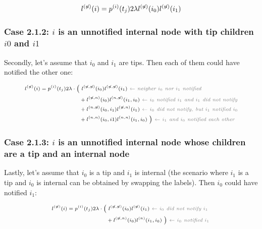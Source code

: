 \documentclass[10pt,letterpaper]{article}
\begin{document}
\begin{equation}
\scriptsize
l^{(\not{n})}(i) = p^{(i)}(t_j) 2\lambda l^{(\not{n})}(i_0)l^{(\not{n})}(i_1) \label{eq:lu-int-int}
\end{equation}

\subsubsection*{Case 2.1.2: $i$ is an unnotified internal node with tip children $i0$ and $i1$}

Secondly, let's assume that $i_0$ and $i_1$ are tips. Then each of them could have notified the other one:

\begin{equation}
\scriptsize
\begin{split}
l^{(\not{n})}(i) = p^{(i)}(t_j) 2\lambda \cdot 
\Big(&~l^{(\not{n},\not{n})}(i_0)l^{(\not{n},\not{n})}(i_1) \textit{\color{gray}~$\leftarrow$ neigher $i_0$ nor $i_1$ notified} \\
&+ l^{(\not{n},n)}(i_0)l^{(n,\not{n})}(i_1,i_0) \textit{\color{gray}~$\leftarrow$ $i_0$ notified $i_1$ and $i_1$ did not notify} \\
&+ l^{(n,\not{n})}(i_0,i_1)l^{(\not{n},n)}(i_1) \textit{\color{gray}~$\leftarrow$ $i_0$ did not notify, but $i_1$ notified $i_0$} \\
&+ l^{(n,n)}(i_0,i1)l^{(n,n)}(i_1,i_0)~\Big) \textit{\color{gray}~$\leftarrow$ $i_1$ and $i_0$ notified each other} \\
\end{split}\label{eq:lu-tip-tip}
\end{equation}

\subsubsection*{Case 2.1.3: $i$ is an unnotified internal node whose children are a tip and an internal node}
Lastly, let's assume that $i_0$ is a tip and $i_1$ is internal (the scenario where $i_1$ is a tip and $i_0$ is internal can be obtained by swapping the labels). Then $i_0$ could have notified $i_1$:


\begin{equation}
\scriptsize
\begin{split}
l^{(\not{n})}(i) = p^{(i)}(t_j) 2\lambda \cdot 
\Big(&~l^{(\not{n},\not{n})}(i_0)l^{(\not{n})}(i_1) \textit{\color{gray}~$\leftarrow$ $i_0$ did not notify $i_1$ } \\
&+ l^{(\not{n},n)}(i_0)l^{(n)}(i_1,i_0)~\Big) \textit{\color{gray}~$\leftarrow$ $i_0$ notified $i_1$} \\
\end{split}\label{eq:lu-int-tip}
\end{equation}
\end{document}
